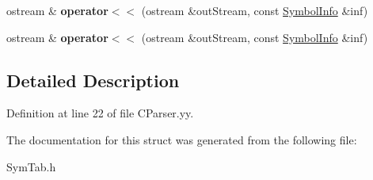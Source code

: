 \begin{DoxyCompactItemize}
\item 
\hypertarget{structSymbolInfo_a4fdd5318cd23696f82e8b29daa716504}{ostream \& {\bfseries operator$<$$<$} (ostream \&out\-Stream, const \hyperlink{structSymbolInfo}{Symbol\-Info} \&inf)}\label{structSymbolInfo_a4fdd5318cd23696f82e8b29daa716504}

\item 
\hypertarget{structSymbolInfo_a4fdd5318cd23696f82e8b29daa716504}{ostream \& {\bfseries operator$<$$<$} (ostream \&out\-Stream, const \hyperlink{structSymbolInfo}{Symbol\-Info} \&inf)}\label{structSymbolInfo_a4fdd5318cd23696f82e8b29daa716504}

\end{DoxyCompactItemize}


\subsection{Detailed Description}


Definition at line 22 of file C\-Parser.\-yy.



The documentation for this struct was generated from the following file\-:\begin{DoxyCompactItemize}
\item 
Sym\-Tab.\-h\end{DoxyCompactItemize}
